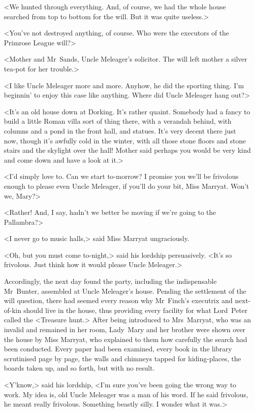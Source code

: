 <We hunted through everything. And, of course, we had the whole house searched from top to bottom for the will. But it was quite useless.>

<You've not destroyed anything, of course. Who were the executors of the Primrose League will?>

<Mother and Mr~Sands, Uncle Meleager's solicitor. The will left mother a silver tea-pot for her trouble.>

<I like Uncle Meleager more and more. Anyhow, he did the sporting thing. I'm beginnin' to enjoy this case like anything. Where did Uncle Meleager hang out?>

<It's an old house down at Dorking. It's rather quaint. Somebody had a fancy to build a little Roman villa sort of thing there, with a verandah behind, with columns and a pond in the front hall, and statues. It's very decent there just now, though it's awfully cold in the winter, with all those stone floors and stone stairs and the skylight over the hall! Mother said perhaps you would be very kind and come down and have a look at it.>

<I'd simply love to. Can we start to-morrow? I promise you we'll be frivolous enough to please even Uncle Meleager, if you'll do your bit, Miss Marryat. Won't we, Mary?>

<Rather! And, I say, hadn't we better be moving if we're going to the Pallambra?>

<I never go to music halls,> said Miss Marryat ungraciously.

<Oh, but you must come to-night,> said his lordship persuasively. <It's so frivolous. Just think how it would please Uncle Meleager.>

\divider
Accordingly, the next day found the party, including the indispensable Mr~Bunter, assembled at Uncle Meleager's house. Pending the settlement of the will question, there had seemed every reason why Mr~Finch's executrix and next-of-kin should live in the house, thus providing every facility for what Lord~Peter called the <Treasure hunt.> After being introduced to Mrs~Marryat, who was an invalid and remained in her room, Lady~Mary and her brother were shown over the house by Miss Marryat, who explained to them how carefully the search had been conducted. Every paper had been examined, every book in the library scrutinised page by page, the walls and chimneys tapped for hiding-places, the boards taken up, and so forth, but with no result.

<Y'know,> said his lordship, <I'm sure you've been going the wrong way to work. My idea is, old Uncle Meleager was a man of his word. If he said frivolous, he meant really frivolous. Something beastly silly. I wonder what it was.>

